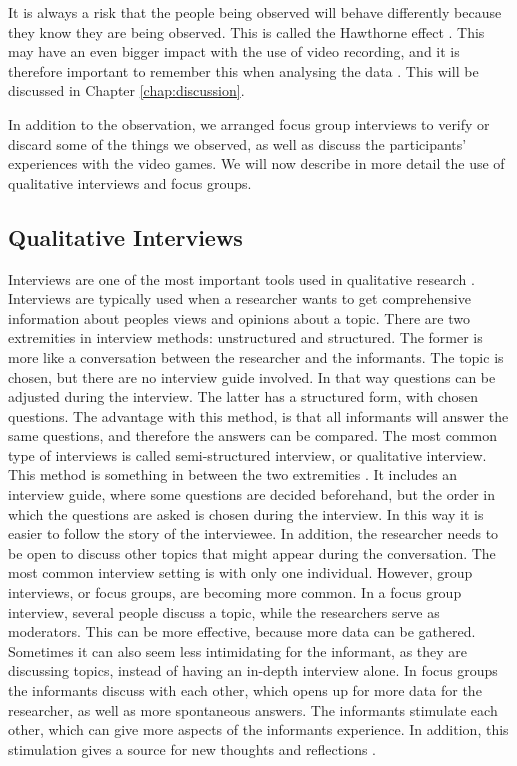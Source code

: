 It is always a risk that the people being observed will behave differently because they know they are being observed. This is called the Hawthorne effect \cite{interview}. This may have an even bigger impact with the use of video recording, and it is therefore important to remember this when analysing the data \cite{tjora}. This will be discussed in Chapter \ref{chap:discussion}. 

In addition to the observation, we arranged focus group interviews to verify or discard some of the things we observed, as well as discuss the participants' experiences with the video games. We will now describe in more detail the use of qualitative interviews and focus groups.  

\subsection{Qualitative Interviews}
Interviews are one of the most important tools used in qualitative research \cite{interview}. Interviews are typically used when a researcher wants to get comprehensive information about peoples views and opinions about a topic. There are two extremities in interview methods: unstructured and structured. The former is more like a conversation between the researcher and the informants. The topic is chosen, but there are no interview guide involved. In that way questions can be adjusted during the interview. The latter has a structured form, with chosen questions. The advantage with this method, is that all informants will answer the same questions, and therefore the answers can be compared. The most common type of interviews is called semi-structured interview, or qualitative interview. This method is something in between the two extremities \cite{qualitative}. It includes an interview guide, where some questions are decided beforehand, but the order in which the questions are asked is chosen during the interview. In this way it is easier to follow the story of the interviewee. In addition, the researcher needs to be open to discuss other topics that might appear during the conversation. The most common interview setting is with only one individual. However, group interviews, or focus groups, are becoming more common. In a focus group interview, several people discuss a topic, while the researchers serve as moderators. This can be more effective, because more data can be gathered. Sometimes it can also seem less intimidating for the informant, as they are discussing topics, instead of having an in-depth interview alone. In focus groups the informants discuss with each other, which opens up for more data for the researcher, as well as more spontaneous answers. The informants stimulate each other, which can give more aspects of the informants experience. In addition, this stimulation gives a source for new thoughts and reflections \cite{tjora}. 

